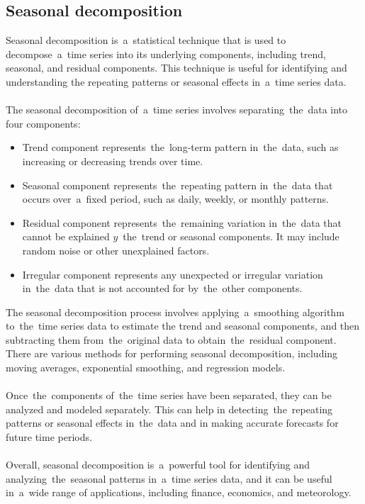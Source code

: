 \subsection{Seasonal decomposition}\label{subsec:seasonal}
Seasonal decomposition is~a~statistical technique that is used to decompose~a~time series into its underlying components,
including trend, seasonal, and residual components. This technique is useful for identifying and understanding
the repeating patterns or seasonal effects in~a~time series data.\\
\\
The seasonal decomposition of~a~time series involves separating~the~data into four components:
\begin{itemize}
    \item Trend component represents~the~long-term pattern in~the~data, such as increasing or
    decreasing trends over time.
    \item Seasonal component represents~the~repeating pattern in~the~data that occurs over~a~fixed
    period, such as daily, weekly, or monthly patterns.
    \item Residual component represents~the~remaining variation in~the~data that cannot be explained
    $y$~the~trend or seasonal components. It may include random noise or other unexplained factors.
    \item Irregular component represents any unexpected or irregular variation in~the~data that is not
    accounted for by~the~other components.
\end{itemize}
The seasonal decomposition process involves applying~a~smoothing algorithm to~the~time series data to estimate the
trend and seasonal components, and then subtracting them from~the~original data to obtain~the~residual component.
There are various methods for performing seasonal decomposition, including moving averages, exponential smoothing,
and regression models.\\
\\
Once~the~components of~the~time series have been separated, they can be analyzed and modeled separately.
This can help in detecting~the~repeating patterns or seasonal effects in~the~data and in making accurate forecasts for
future time periods.\\
\\
Overall, seasonal decomposition is~a~powerful tool for identifying and analyzing~the~seasonal patterns in~a~time series
data, and it can be useful in~a~wide range of applications, including finance, economics, and meteorology.\\

